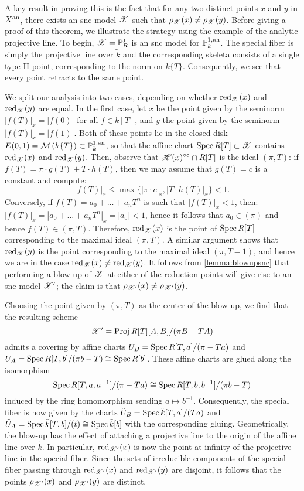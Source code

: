 A key result in proving this is the fact that for any two distinct points $x$ and $y$ in $X^{\text{an}}$, there exists an snc model $\mathscr{X}$ such that $\rho_{\mathscr{X}}(x) \neq \rho_{\mathscr{X}}(y)$. 
Before giving a proof of this theorem, we illustrate the strategy using the example of the analytic projective line.
To begin, $\mathscr{X} = \mathbb{P}^{1}_{R}$ is an snc model for $\mathbb{P}^{1, \text{an}}_{k}$. 
The special fiber is simply the projective line over $\tilde{k}$ and the corresponding skeleta consists of a single type II point, corresponding to the norm on $k\{T\}$.
Consequently, we see that every point retracts to the same point. 

We split our analysis into two cases, depending on whether $\operatorname{red}_{\mathscr{X}}(x)$ and $\operatorname{red}_{\mathscr{X}}(y)$ are equal. 
In the first case, let $x$ be the point given by the seminorm $|f(T)|_x = |f(0)|$ for all $f \in k[T]$, and $y$ the point given by the seminorm $|f(T)|_x = |f(1)|$.
Both of these points lie in the closed disk $E(0, 1) = \mathcal{M}\left(k\{T\}\right) \subset \mathbb{P}^{1, \text{an}}_{k}$, so that the affine chart $\operatorname{Spec} R[T] \subset \mathscr{X}$ contains $\operatorname{red}_{\mathscr{X}}(x)$ and $\operatorname{red}_{\mathscr{X}}(y)$.
Then, observe that $\mathscr{H}(x)^{\circ\circ} \cap R[T]$ is the ideal $(\pi, T)$: if $f(T) = \pi \cdot g(T) + T \cdot h(T)$, then we may assume that $g(T) = c$ is a constant and compute:
\[
|f(T)|_x \leq \max\{ |\pi \cdot c|_x, |T \cdot h(T)|_x \} < 1.
\]
Conversely, if $f(T) = a_0 + \dots + a_n T^n$ is such that $|f(T)|_x < 1$, then: $|f(T)|_x = |a_0 + \dots + a_n T^n|_x = |a_0| < 1$, hence it follows that $a_0 \in (\pi)$ and hence $f(T) \in (\pi, T)$. 
Therefore, $\operatorname{red}_{\mathscr{X}}(x)$ is the point of $\operatorname{Spec} R[T]$ corresponding to the maximal ideal $(\pi, T)$.
A similar argument shows that $\operatorname{red}_{\mathscr{X}}(y)$ is the point corresponding to the maximal ideal $(\pi, T - 1)$, and hence we are in the case $\operatorname{red}_{\mathscr{X}}(x) \neq \operatorname{red}_{\mathscr{X}}(y)$. 
It follows from \cref{lemma:blowupsnc} that performing a blow-up of $\mathscr{X}$ at either of the reduction points will give rise to an snc model $\mathscr{X}^{\prime}$; the claim is that $\rho_{\mathscr{X}^\prime}(x) \neq \rho_{\mathscr{X}^{\prime}}(y)$.

Choosing the point given by $(\pi, T)$ as the center of the blow-up, we find that the resulting scheme 
\[\mathscr{X}^\prime = \operatorname{Proj} R[T][A, B]/(\pi B - T A)\] 
admits a covering by affine charts $U_{B} = \operatorname{Spec} R[T, a]/(\pi - T a)$ and $U_{A} = \operatorname{Spec} R[T, b]/(\pi b - T) \cong \operatorname{Spec} R[b]$.
These affine charts are glued along the isomorphism \[\operatorname{Spec} R[T, a, a^{-1}]/(\pi - T a) \cong \operatorname{Spec} R[T, b, b^{-1}]/(\pi b - T)\] induced by the ring homomorphism sending $a \mapsto b^{-1}$.
Consequently, the special fiber is now given by the charts $\tilde{U}_{B} = \operatorname{Spec} \tilde{k}[T, a]/(T a)$ and $\tilde{U}_{A} = \operatorname{Spec} \tilde{k}[T, b]/(t) \cong \operatorname{Spec} \tilde{k}[b]$ with the corresponding gluing. 
Geometrically, the blow-up has the effect of attaching a projective line to the origin of the affine line over $\tilde{k}$.
In particular, $\operatorname{red}_{\mathscr{X}^{\prime}}(x)$ is now the point at infinity of the projective line in the special fiber.
Since the sets of irreducible components of the special fiber passing through $\operatorname{red}_{\mathscr{X}'}(x)$ and $\operatorname{red}_{\mathscr{X}'}(y)$ are disjoint, it follows that the points $\rho_{\mathscr{X}^\prime}(x)$ and $\rho_{\mathscr{X}^\prime}(y)$ are distinct.

